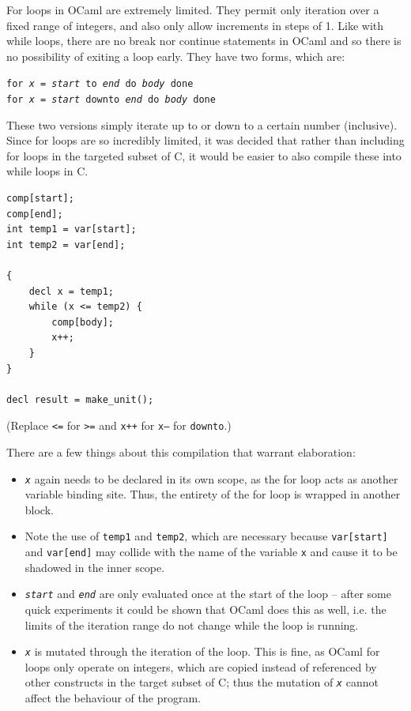 \documentclass[12pt,a4paper,twoside,openright]{report}
\begin{document}
For loops in OCaml are extremely limited. They permit only iteration over a 
fixed range of integers, and also only allow increments in steps of 1. Like 
with while loops, there are no break nor continue statements in OCaml and so 
there is no possibility of exiting a loop early. They have two forms, which are:

\begin{center}
\texttt{for \emph{x} = \emph{start} to \emph{end} do \emph{body} done}\\
\texttt{for \emph{x} = \emph{start} downto \emph{end} do \emph{body} done}\\
\end{center}

These two versions simply iterate up to or down to a certain number 
(inclusive). Since for loops are so incredibly limited, it was decided 
that rather than including for loops in the targeted subset of C, it would be 
easier to also compile these into while loops in C.

\begin{lstlisting}
comp[start];
comp[end];
int temp1 = var[start];
int temp2 = var[end];

{
    decl x = temp1;
    while (x <= temp2) {
        comp[body];
        x++;
    }
}

decl result = make_unit();
\end{lstlisting}

(Replace \texttt{<=} for \texttt{>=} and \texttt{x++} for \texttt{x--} for 
\texttt{downto}.)

There are a few things about this compilation that warrant elaboration:
\begin{itemize}
\item \texttt{\emph{x}} again needs to be declared in its own scope, as the for 
loop acts as another variable binding site. Thus, the entirety of the for loop 
is wrapped in another block.

\item Note the use of \texttt{temp1} and \texttt{temp2}, which are necessary 
because \texttt{var[start]} and \texttt{var[end]} may collide with the name of 
the variable \texttt{x} and cause it to be shadowed in the inner scope.

\item \texttt{\emph{start}} and \texttt{\emph{end}} are only evaluated once at 
the start of the loop -- after some quick experiments it could be shown that 
OCaml does this as well, i.e. the limits of the iteration range do not change 
while the loop is running.

\item \texttt{\emph{x}} is mutated through the iteration of the loop. This is 
fine, as OCaml for loops only operate on integers, which are copied instead of 
referenced by other constructs in the target subset of C; thus the mutation of 
\texttt{\emph{x}} cannot affect the behaviour of the program.
\end{itemize}
\end{document}
